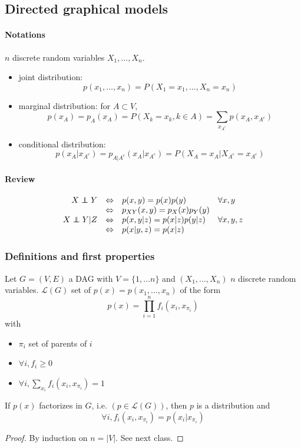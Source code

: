 \documentclass[12pt]{report}
\newcommand\independent{\protect\mathpalette{\protect\independenT}{\perp}}
\def\independenT#1#2{\mathrel{\rlap{$#1#2$}\mkern2mu{#1#2}}}
\begin{document}
\subsection{Directed graphical models}
\paragraph{Notations}
 $n$ discrete random variables $X_{1},\ldots,X_{n}$.
 \begin{itemize}
 \item joint distribution: $$p(x_{1},\ldots,x_{n})=P(X_{1}=x_{1},\ldots,X_{n}=x_{n})$$
\item marginal distribution: for $A\subset V$, $$p(x_{A})=p_{A}(x_{A})=P(X_{k}=x_{k},k\in A)=\sum_{x_{A^{c}}}
p(x_{A},x_{A^{c}})$$
\item conditional distribution: $$p(x_{A}|x_{A^{c}})=p_{A|A^{c}}(x_{A}|x_{A^{c}})=P(X_{A}=x_{A}|X_{A^{c}}=x_{A^{c}})$$
 \end{itemize}

\paragraph{Review}
$$\begin{array}{rcll}
X\independent  
Y&\Leftrightarrow& 
p(x,y)=p(x)p(y)& \forall x,y\\
&\Leftrightarrow&p_{XY}
(x,y)=p_{X}(x)p_{Y}(y)&\\
X\independent Y|
Z&\Leftrightarrow&p(x,y|
z)=p(x|z)p(y|z)& \forall 
x,y,z\\
&\Leftrightarrow &p(x|
y,z)=p(x|z)&
\end{array}$$


\subsubsection{Definitions and first properties} Let $G=(V,E)$ a DAG with $V=\lbrace1,\ldots n\rbrace$ and $(X_{1},\ldots,X_{n})$ $n$ discrete random variables. $ \mathcal{L}(G)$ set of $p(x)=p(x_{1},\ldots,x_{n})$ of the form $$p(x)=\prod_{i=1}^{n}f_{i}(x_{i},x_{\pi_{i}})$$ with\begin{itemize}
\item $\pi_{i}$ set of parents of $i$
\item $\forall i, f_{i}\geqslant0$
\item $\forall i,\sum_{x_{i}}f_{i}(x_{i},x_{\pi_{i}})=1$
\end{itemize} 

\begin{proposition}
If $p(x)$ factorizes in $G$,  i.e. $(p\in\mathcal{L}(G))$, then $p$ is a distribution and $$\forall i, f_{i}(x_{i},x_{\pi_{i}})=
p(x_{i}|x_{\pi_{i}})$$
\end{proposition}
\begin{proof}
By induction on $n=|V|$. See next class.

 \end{proof}
\end{document}
